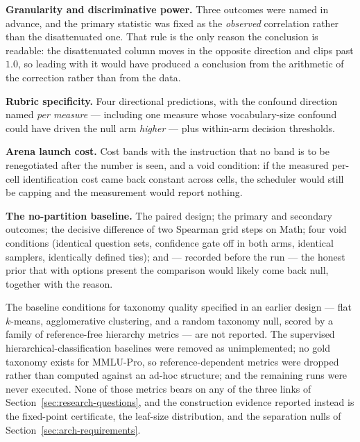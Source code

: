 \textbf{Granularity and discriminative power.} Three outcomes were
named in advance, and the primary statistic was fixed as the
\emph{observed} correlation rather than the disattenuated one. That
rule is the only reason the conclusion is readable: the disattenuated
column moves in the opposite direction and clips past $1.0$, so leading
with it would have produced a conclusion from the arithmetic of the
correction rather than from the data.

\textbf{Rubric specificity.} Four directional predictions, with the
confound direction named \emph{per measure} --- including one measure
whose vocabulary-size confound could have driven the null arm
\emph{higher} --- plus within-arm decision thresholds.

\textbf{Arena launch cost.} Cost bands with the instruction that no
band is to be renegotiated after the number is seen, and a void
condition: if the measured per-cell identification cost came back
constant across cells, the scheduler would still be capping and the
measurement would report nothing.

\textbf{The no-partition baseline.} The paired design; the primary and
secondary outcomes; the decisive difference of two Spearman grid steps
on Math; four void conditions (identical question sets, confidence gate
off in both arms, identical samplers, identically defined ties); and
--- recorded before the run --- the honest prior that with options
present the comparison would likely come back null, together with the
reason.

The baseline conditions for taxonomy quality specified in an earlier
design --- flat $k$-means, agglomerative clustering, and a random
taxonomy null, scored by a family of reference-free hierarchy metrics
--- are not reported. The supervised hierarchical-classification
baselines were removed as unimplemented; no gold taxonomy exists for
MMLU-Pro, so reference-dependent metrics were dropped rather than
computed against an ad-hoc structure; and the remaining runs were never
executed. None of those metrics bears on any of the three links of
Section~\ref{sec:research-questions}, and the construction evidence
reported instead is the fixed-point certificate, the leaf-size
distribution, and the separation nulls of
Section~\ref{sec:arch-requirements}.


